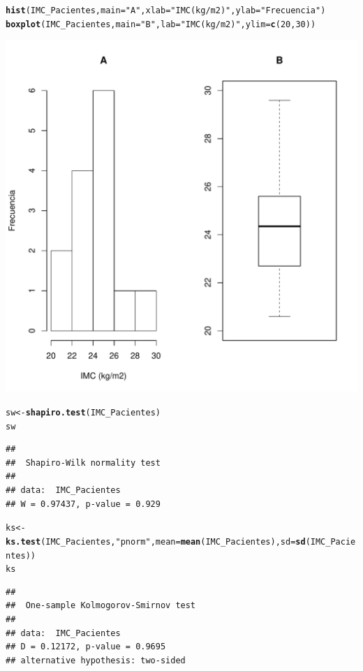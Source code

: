 \documentclass[10pt,a4paper]{article}\usepackage[]{graphicx}\usepackage[]{color}
\makeatletter
\def\maxwidth{ %
  \ifdim\Gin@nat@width>\linewidth
    \linewidth
  \else
    \Gin@nat@width
  \fi
}
\newcommand{\hlnum}[1]{\textcolor[rgb]{0.686,0.059,0.569}{#1}}%
\newcommand{\hlstr}[1]{\textcolor[rgb]{0.192,0.494,0.8}{#1}}%
\newcommand{\hlstd}[1]{\textcolor[rgb]{0.345,0.345,0.345}{#1}}%
\newcommand{\hlkwb}[1]{\textcolor[rgb]{0.69,0.353,0.396}{#1}}%
\newcommand{\hlkwc}[1]{\textcolor[rgb]{0.333,0.667,0.333}{#1}}%
\newcommand{\hlkwd}[1]{\textcolor[rgb]{0.737,0.353,0.396}{\textbf{#1}}}%
\newenvironment{kframe}{%
 \def\at@end@of@kframe{}%
 \ifinner\ifhmode%
  \def\at@end@of@kframe{\end{minipage}}%
  \begin{minipage}{\columnwidth}%
 \fi\fi%
 \def\FrameCommand##1{\hskip\@totalleftmargin \hskip-\fboxsep
 \colorbox{shadecolor}{##1}\hskip-\fboxsep
     \hskip-\linewidth \hskip-\@totalleftmargin \hskip\columnwidth}%
 \MakeFramed {\advance\hsize-\width
   \@totalleftmargin\z@ \linewidth\hsize
   \@setminipage}}%
 {\par\unskip\endMakeFramed%
 \at@end@of@kframe}
\newenvironment{knitrout}{}{} %
\makeatother
\begin{document}
\begin{knitrout}
\begin{kframe}
\begin{alltt}
\hlkwd{hist}\hlstd{(IMC_Pacientes,}\hlkwc{main}\hlstd{=}\hlstr{"A"}\hlstd{,}\hlkwc{xlab}\hlstd{=}\hlstr{"IMC (kg/m2)"}\hlstd{,}\hlkwc{ylab}\hlstd{=}\hlstr{"Frecuencia"}\hlstd{)}
\hlkwd{boxplot}\hlstd{(IMC_Pacientes,}\hlkwc{main}\hlstd{=}\hlstr{"B"}\hlstd{,} \hlkwc{lab}\hlstd{=}\hlstr{"IMC (kg/m2)"}\hlstd{,}\hlkwc{ylim}\hlstd{=}\hlkwd{c}\hlstd{(}\hlnum{20}\hlstd{,}\hlnum{30}\hlstd{))}
\end{alltt}
\end{kframe}
\includegraphics[width=\maxwidth]{figure/unnamed-chunk-1-2} 
\begin{kframe}\begin{alltt}
\hlstd{sw} \hlkwb{<-} \hlkwd{shapiro.test}\hlstd{(IMC_Pacientes)}
\hlstd{sw}
\end{alltt}
\begin{verbatim}
## 
## 	Shapiro-Wilk normality test
## 
## data:  IMC_Pacientes
## W = 0.97437, p-value = 0.929
\end{verbatim}
\begin{alltt}
\hlstd{ks} \hlkwb{<-} \hlkwd{ks.test}\hlstd{(IMC_Pacientes,}\hlstr{"pnorm"}\hlstd{,}\hlkwc{mean}\hlstd{=}\hlkwd{mean}\hlstd{(IMC_Pacientes),}\hlkwc{sd}\hlstd{=}\hlkwd{sd}\hlstd{(IMC_Pacientes))}
\hlstd{ks}
\end{alltt}
\begin{verbatim}
## 
## 	One-sample Kolmogorov-Smirnov test
## 
## data:  IMC_Pacientes
## D = 0.12172, p-value = 0.9695
## alternative hypothesis: two-sided
\end{verbatim}
\end{kframe}
\end{knitrout}
\end{document}
